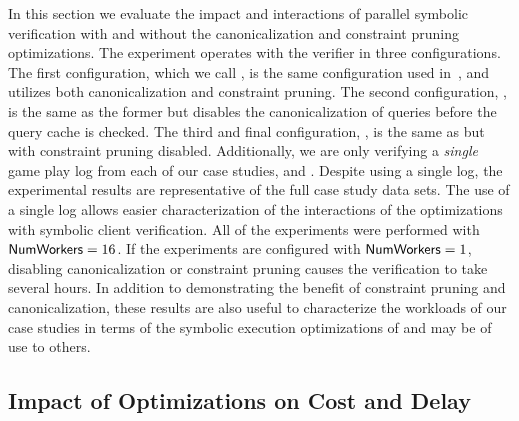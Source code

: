 In this section we evaluate the impact and interactions of parallel
symbolic verification with and without the canonicalization and
constraint pruning optimizations. The experiment operates with
the verifier in three configurations.
The first configuration, which we call \allopt,
is the same configuration used in~, and utilizes
both canonicalization and constraint pruning. The second
configuration, \nocanon, is the same as the former but disables the
canonicalization of queries before the query cache is checked. The
third and final configuration, \noprune, is the same as \allopt
but with constraint pruning disabled. Additionally, we are only
verifying a \emph{single} game play log from each of our case studies,
\xpilot and \tetrinet. Despite using a single log,
the experimental results are representative of
the full case study data sets. The use of a single log
allows easier characterization of the interactions of the optimizations with
symbolic client verification. All of the experiments were performed
with $\mathsf{NumWorkers} = 16$. If the experiments are configured with
$\mathsf{NumWorkers} = 1$, disabling canonicalization or constraint pruning
causes the verification to take several hours. In addition to
demonstrating the benefit of constraint pruning and canonicalization,
these results are also useful to characterize the workloads of our
case studies in terms of the symbolic execution optimizations of \klee
and may be of use to others.

\subsection{Impact of Optimizations on Cost and Delay}

